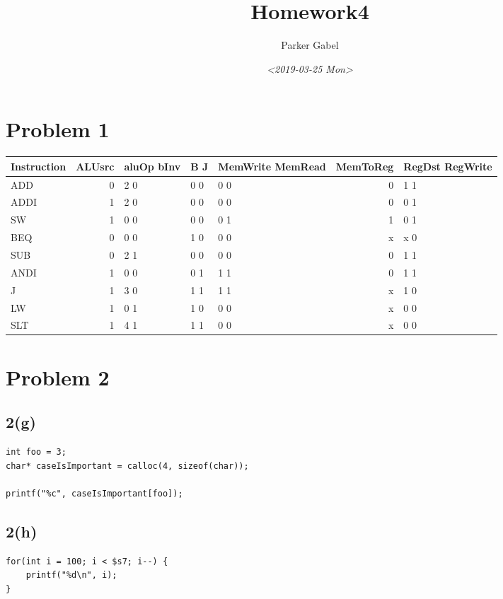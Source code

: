 \documentclass[11pt]{article}
\author{Parker Gabel}
\date{\textit{<2019-03-25 Mon>}}
\title{Homework4}
\begin{document}
\maketitle
\section{Problem 1}
\label{sec:org5075726}
\begin{center}
\begin{tabular}{lrlllrl}
Instruction & ALUsrc & aluOp bInv & B J & MemWrite MemRead & MemToReg & RegDst RegWrite\\
\hline
ADD & 0 & 2    0 & 0 0 & 0        0 & 0 & 1       1\\
ADDI & 1 & 2    0 & 0 0 & 0        0 & 0 & 0       1\\
SW & 1 & 0    0 & 0 0 & 0        1 & 1 & 0       1\\
BEQ & 0 & 0    0 & 1 0 & 0        0 & x & x       0\\
SUB & 0 & 2    1 & 0 0 & 0        0 & 0 & 1       1\\
ANDI & 1 & 0    0 & 0 1 & 1        1 & 0 & 1       1\\
J & 1 & 3    0 & 1 1 & 1        1 & x & 1       0\\
LW & 1 & 0    1 & 1 0 & 0        0 & x & 0       0\\
SLT & 1 & 4    1 & 1 1 & 0        0 & x & 0       0\\
\end{tabular}
\end{center}
\section{Problem 2}
\label{sec:org18f7356}
\subsection{2(g)}
\label{sec:org57a8496}
\begin{verbatim}
int foo = 3;
char* caseIsImportant = calloc(4, sizeof(char));

printf("%c", caseIsImportant[foo]);
\end{verbatim}
\subsection{2(h)}
\label{sec:org51b1f21}
\begin{verbatim}
for(int i = 100; i < $s7; i--) {
    printf("%d\n", i);
}
\end{verbatim}
\end{document}
